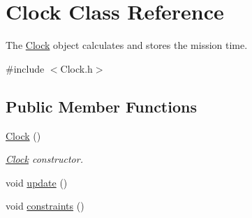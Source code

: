 \hypertarget{classClock}{}\section{Clock Class Reference}
\label{classClock}


The \hyperlink{classClock}{Clock} object calculates and stores the mission time.  




{\ttfamily \#include $<$Clock.\+h$>$}

\subsection*{Public Member Functions}
\begin{DoxyCompactItemize}
\item 
\hyperlink{classClock_adbc370eb6b5f8d01645cf440188160a8}{Clock} ()\hypertarget{classClock_adbc370eb6b5f8d01645cf440188160a8}{}\label{classClock_adbc370eb6b5f8d01645cf440188160a8}

\begin{DoxyCompactList}\small\item\em \hyperlink{classClock}{Clock} constructor. \end{DoxyCompactList}\item 
void \hyperlink{classClock_ae7c6708cf04b233655b501a97bb1e802}{update} ()
\item 
void \hyperlink{classClock_abbb62309ad5d955b8bcaff7d485dad93}{constraints} ()
\end{DoxyCompactItemize}
